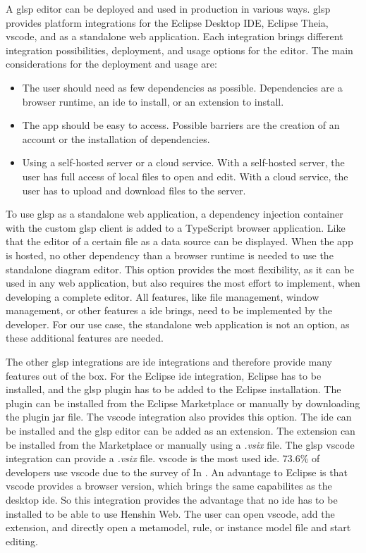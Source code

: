 \documentclass[conference,onecolumn]{IEEEtran}
\begin{document}
  A \ac{glsp} editor can be deployed and used in production in various ways. \ac{glsp} provides platform integrations for the Eclipse Desktop IDE, Eclipse Theia, \ac{vscode}, and as a standalone web application. Each integration brings different integration possibilities, deployment, and usage options for the editor. \cite{glsp-doc} The main considerations for the deployment and usage are:
  \begin{itemize}
    \item The user should need as few dependencies as possible. Dependencies are a browser runtime, an \acs{ide} to install, or an extension to install.
    \item The app should be easy to access. Possible barriers are the creation of an account or the installation of dependencies.
    \item Using a self-hosted server or a cloud service. With a self-hosted server, the user has full access of local files to open and edit. With a cloud service, the user has to upload and download files to the server.
  \end{itemize}
  
  To use \ac{glsp} as a standalone web application, a dependency injection container with the custom \ac{glsp} client is added to a TypeScript browser application. Like that the editor of a certain file as a data source can be displayed. When the app is hosted, no other dependency than a browser runtime is needed to use the standalone diagram editor. \cite{glsp-client-repo} This option provides the most flexibility, as it can be used in any web application, but also requires the most effort to implement, when developing a complete editor. All features, like file management, window management, or other features a \acs{ide} brings, need to be implemented by the developer. \cite{glsp-client-repo} For our use case, the standalone web application is not an option, as these additional features are needed. 

  The other \ac{glsp} integrations are \acs{ide} integrations and therefore provide many features out of the box. For the Eclipse \acs{ide} integration, Eclipse has to be installed, and the \ac{glsp} plugin has to be added to the Eclipse installation. The plugin can be installed from the Eclipse Marketplace or manually by downloading the plugin jar file. \cite{eclipse-doc} The \ac{vscode} integration also provides this option. The \acs{ide} can be installed and the \ac{glsp} editor can be added as an extension. The extension can be installed from the Marketplace or manually using a \textit{.vsix} file. \cite{vscode-doc} The \ac{glsp} \ac{vscode} integration can provide a \textit{.vsix} file. \cite{glsp-repo} \ac{vscode} is the most used \acs{ide}. 73.6\% of developers use \ac{vscode} due to the survey of \citeauthor{stackoverflow2024survey} In \citeyear{stackoverflow2024survey} \cite{stackoverflow2024survey}. An advantage to Eclipse is that \ac{vscode} provides a browser version, which brings the same capabilites as the desktop \acs{ide}. \cite{vscode-doc} So this integration provides the advantage that no \acs{ide} has to be installed to be able to use Henshin Web. The user can open \ac{vscode}, add the extension, and directly open a metamodel, rule, or instance model file and start editing. 
\end{document}
